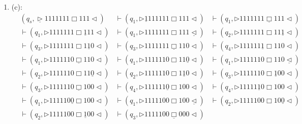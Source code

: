 \documentclass[12pt,a4paper]{article}
\makeatletter
\newtheorem*{solution}{Solution}
\theoremstyle{definition}
\renewenvironment{solution}[1][Solution] {\par\pushQED{\qed}\normalfont\topsep6\p@\@plus6\p@\relax\trivlist\item[\hskip\labelsep\bfseries#1\@addpunct{.}]\ignorespaces}{\popQED\endtrivlist\@endpefalse} \makeatother
\makeatother
\begin{document}
\begin{enumerate}
\begin{solution}
    
    (c):\\
    \begin{equation*}
        \begin{aligned}
    &(q_s,\underline{\triangleright}  1  1  1  1  1  1  1  \Box 1  1  1   \triangleleft)
    &\vdash (q_1,\triangleright  \underline{1}  1  1  1  1  1  1  \Box 1  1  1   \triangleleft)
    &\vdash (q_1,\triangleright  1  1  1  1  1  1  1  \underline{\Box} 1  1  1   \triangleleft)
    \\
    &\vdash (q_1,\triangleright  1  1  1  1  1  1  1  \Box \underline{1}  1  1   \triangleleft)
    &\vdash (q_1,\triangleright  1  1  1  1  1  1  1  \Box 1  1  1   \underline\triangleleft)
    &\vdash (q_2,\triangleright  1  1  1  1  1  1  1  \Box 1  1  \underline1   \triangleleft)
    \\
    &\vdash (q_3,\triangleright  1  1  1  1  1  1  1  \Box 1  \underline1  0   \triangleleft)
    &\vdash (q_3,\triangleright  1  1  1  1  1  1  1  \underline\Box 1  1  0   \triangleleft)
    &\vdash (q_4,\triangleright  1  1  1  1  1  1  \underline1  \Box 1  1  0   \triangleleft)
\\
    &\vdash (q_1,\triangleright  1  1  1  1  1  1  0  \underline\Box 1  1  0   \triangleleft)
    &\vdash (q_1,\triangleright  1  1  1  1  1  1  0  \Box 1  1  \underline0   \triangleleft)
    &\vdash (q_1,\triangleright  1  1  1  1  1  1  0  \Box 1  1  0   \underline\triangleleft)
\\
    &\vdash (q_2,\triangleright  1  1  1  1  1  1  0  \Box 1  1  \underline0   \triangleleft)
    &\vdash (q_2,\triangleright  1  1  1  1  1  1  0  \Box 1  \underline1 0  \triangleleft)
    &\vdash (q_3,\triangleright  1  1  1  1  1  1  0  \Box \underline{1}  0  0   \triangleleft)
\\
    &\vdash (q_3,\triangleright  1  1  1  1  1  1  0  \underline\Box 1  0  0   \triangleleft)
    &\vdash (q_4,\triangleright  1  1  1  1  1  1  \underline0  \Box 1 0 0   \triangleleft)
    &\vdash (q_4,\triangleright  1  1  1  1  1  \underline1  0  \Box 1 0 0   \triangleleft)
\\
    &\vdash (q_1,\triangleright  1  1  1  1  1  0  \underline0  \Box 1  0  0   \triangleleft)
    &\vdash (q_1,\triangleright  1  1  1  1  1  0  0  \Box 1  0  0   \underline\triangleleft)
    &\vdash (q_2,\triangleright  1  1  1  1  1  0  0  \Box 1  0  \underline0   \triangleleft)
\\
    &\vdash (q_2,\triangleright  1  1  1  1  1  0  0  \Box \underline{1}  0  0   \triangleleft)
    &\vdash (q_3,\triangleright  1  1  1  1  1  0  0  \underline\Box 0  0  0   \triangleleft)

\end{aligned}
\end{equation*}
\end{solution}
\end{enumerate}
\end{document}
